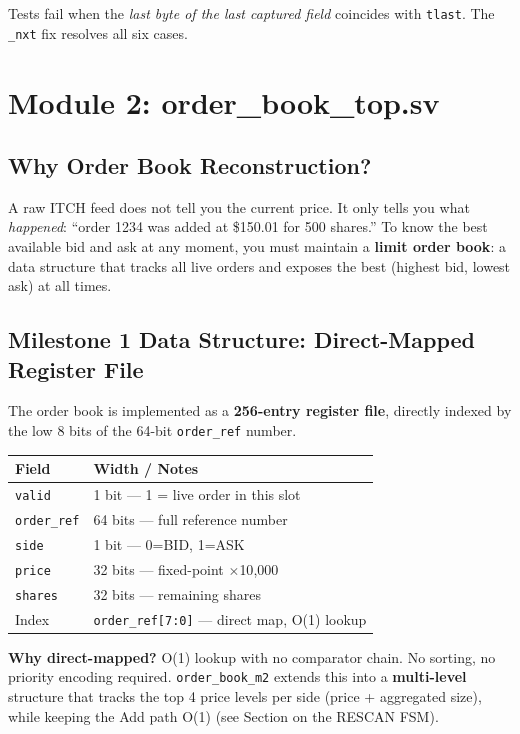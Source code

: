 \documentclass[11pt,a4paper]{article}
\begin{document}
\noindent Tests fail when the \emph{last byte of the last captured field} coincides
with \texttt{tlast}. The \texttt{\_nxt} fix resolves all six cases.

\section{Module 2: order\_book\_top.sv}

\subsection{Why Order Book Reconstruction?}

A raw ITCH feed does not tell you the current price. It only tells you what
\emph{happened}: ``order 1234 was added at \$150.01 for 500 shares.''
To know the best available bid and ask at any moment, you must maintain a
\textbf{limit order book}: a data structure that tracks all live orders and
exposes the best (highest bid, lowest ask) at all times.

\subsection{Milestone 1 Data Structure: Direct-Mapped Register File}

The order book is implemented as a \textbf{256-entry register file}, directly
indexed by the low 8 bits of the 64-bit \texttt{order\_ref} number.

\begin{center}
\small
\begin{tabular}{l l}
\toprule
\textbf{Field} & \textbf{Width / Notes} \\
\midrule
\texttt{valid}     & 1 bit --- 1 = live order in this slot \\
\texttt{order\_ref} & 64 bits --- full reference number \\
\texttt{side}      & 1 bit --- 0=BID, 1=ASK \\
\texttt{price}     & 32 bits --- fixed-point $\times$10{,}000 \\
\texttt{shares}    & 32 bits --- remaining shares \\
\midrule
Index & \texttt{order\_ref[7:0]} --- direct map, O(1) lookup \\
\bottomrule
\end{tabular}
\end{center}

\noindent\textbf{Why direct-mapped?} O(1) lookup with no comparator chain.
No sorting, no priority encoding required. \texttt{order\_book\_m2} extends this
into a \textbf{multi-level} structure that tracks the top 4 price levels per side
(price + aggregated size), while keeping the Add path O(1) (see Section on the
RESCAN FSM).
\end{document}
